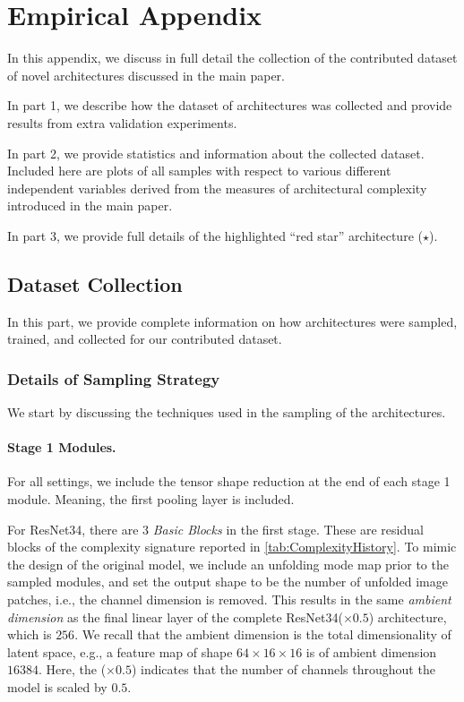\documentclass{article}
\theoremstyle{plain}
\theoremstyle{definition}
\theoremstyle{remark}
\let\oldparagraph\paragraph
\renewcommand{\paragraph}[1]{%
	\vspace{-0.5em}%
	\oldparagraph{#1}%
}
\begin{document}
\clearpage
\section{\label{sec:EmpiricalAppendix}Empirical Appendix}
In this appendix, we discuss in full detail the collection of the contributed dataset of novel architectures discussed in the main paper. 

In part 1, we describe how the dataset of architectures was collected and provide results from extra validation experiments.

In part 2, we provide statistics and information about the collected dataset. Included here are plots of all samples with respect to various different independent variables derived from the measures of architectural complexity introduced in the main paper.

In part 3, we provide full details of the highlighted ``red star'' architecture ({\color{red}$\bm{\star}$}).

\clearpage
\subsection{Dataset Collection\label{sec:DataCollection}} 
In this part, we provide complete information on how architectures were sampled, trained, and collected for our contributed dataset.

\subsubsection{\label{sec:DataCollection_Sampling}Details of Sampling Strategy}
We start by discussing the techniques used in the sampling of the architectures.

\paragraph{Stage 1 Modules.} For all settings, we include the tensor shape reduction at the end of each stage 1 module. Meaning, the first pooling layer is included.

For ResNet34, there are $3$ \textit{Basic Blocks} in the first stage. These are residual blocks of the complexity signature reported in \cref{tab:ComplexityHistory}. To mimic the design of the original model, we include an unfolding mode map prior to the sampled modules, and set the output shape to be the number of unfolded image patches, i.e., the channel dimension is removed. This results in the same \textit{ambient dimension} as the final linear layer of the complete ResNet34($\times 0.5$) architecture, which is $256$. We recall that the ambient dimension is the total dimensionality of latent space, e.g., a feature map of shape $64 \times 16 \times 16$ is of ambient dimension $16384$. Here, the ($\times 0.5$) indicates that the number of channels throughout the model is scaled by $0.5$.
\end{document}
